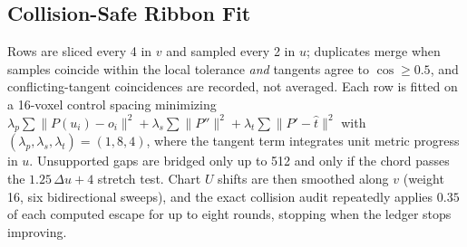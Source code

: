 \subsection{Collision-Safe Ribbon Fit}
\label{app:ribbon}

Rows are sliced every 4 in $v$ and sampled every 2 in $u$; duplicates merge when samples coincide within the local tolerance {\em and} tangents agree to $\cos \ge 0.5$, and conflicting-tangent coincidences are recorded, not averaged. Each row is fitted on a 16-voxel control spacing minimizing
$\lambda_p \sum \lVert P(u_i) - o_i \rVert^2 + \lambda_s \sum \lVert P'' \rVert^2 + \lambda_t \sum \lVert P' - \hat t \rVert^2$
with $(\lambda_p, \lambda_s, \lambda_t) = (1, 8, 4)$, where the tangent term integrates unit metric progress in $u$. Unsupported gaps are bridged only up to 512 and only if the chord passes the $1.25\,\Delta u + 4$ stretch test. Chart $U$ shifts are then smoothed along $v$ (weight 16, six bidirectional sweeps), and the exact collision audit repeatedly applies $0.35$ of each computed escape for up to eight rounds, stopping when the ledger stops improving.
